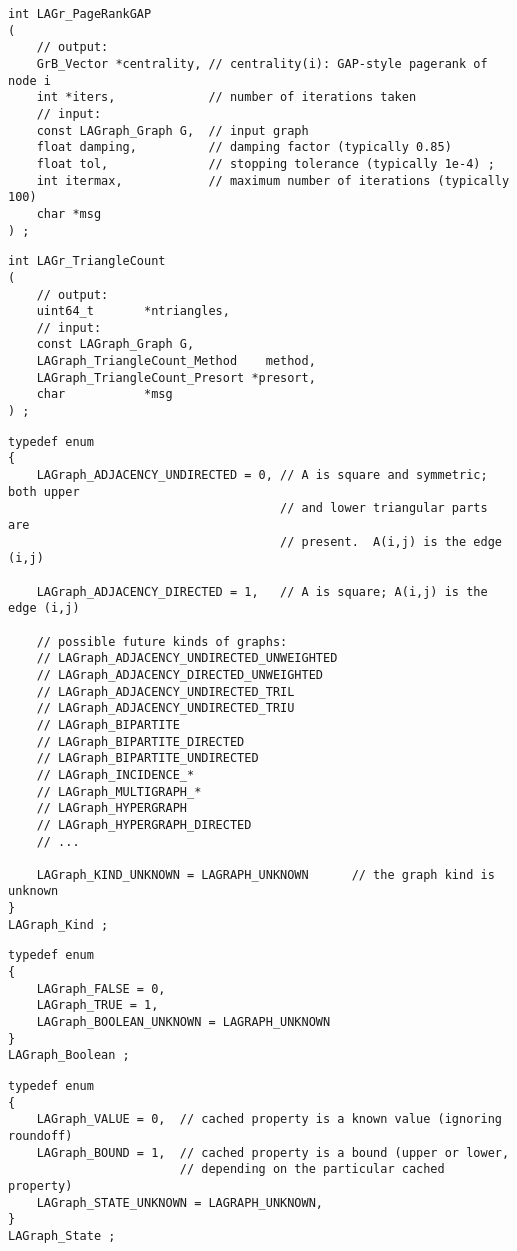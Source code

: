 \begin{verbatim}
int LAGr_PageRankGAP
(
    // output:
    GrB_Vector *centrality, // centrality(i): GAP-style pagerank of node i
    int *iters,             // number of iterations taken
    // input:
    const LAGraph_Graph G,  // input graph
    float damping,          // damping factor (typically 0.85)
    float tol,              // stopping tolerance (typically 1e-4) ;
    int itermax,            // maximum number of iterations (typically 100)
    char *msg
) ;
\end{verbatim}




\begin{verbatim}
int LAGr_TriangleCount
(
    // output:
    uint64_t       *ntriangles,
    // input:
    const LAGraph_Graph G,
    LAGraph_TriangleCount_Method    method,
    LAGraph_TriangleCount_Presort *presort,
    char           *msg
) ;
\end{verbatim}




\begin{verbatim}
typedef enum
{
    LAGraph_ADJACENCY_UNDIRECTED = 0, // A is square and symmetric; both upper
                                      // and lower triangular parts are
                                      // present.  A(i,j) is the edge (i,j)

    LAGraph_ADJACENCY_DIRECTED = 1,   // A is square; A(i,j) is the edge (i,j)

    // possible future kinds of graphs:
    // LAGraph_ADJACENCY_UNDIRECTED_UNWEIGHTED
    // LAGraph_ADJACENCY_DIRECTED_UNWEIGHTED
    // LAGraph_ADJACENCY_UNDIRECTED_TRIL
    // LAGraph_ADJACENCY_UNDIRECTED_TRIU
    // LAGraph_BIPARTITE
    // LAGraph_BIPARTITE_DIRECTED
    // LAGraph_BIPARTITE_UNDIRECTED
    // LAGraph_INCIDENCE_*
    // LAGraph_MULTIGRAPH_*
    // LAGraph_HYPERGRAPH
    // LAGraph_HYPERGRAPH_DIRECTED
    // ...

    LAGraph_KIND_UNKNOWN = LAGRAPH_UNKNOWN      // the graph kind is unknown
}
LAGraph_Kind ;
\end{verbatim}




\begin{verbatim}
typedef enum
{
    LAGraph_FALSE = 0,
    LAGraph_TRUE = 1,
    LAGraph_BOOLEAN_UNKNOWN = LAGRAPH_UNKNOWN
}
LAGraph_Boolean ;
\end{verbatim}




\begin{verbatim}
typedef enum
{
    LAGraph_VALUE = 0,  // cached property is a known value (ignoring roundoff)
    LAGraph_BOUND = 1,  // cached property is a bound (upper or lower,
                        // depending on the particular cached property)
    LAGraph_STATE_UNKNOWN = LAGRAPH_UNKNOWN,
}
LAGraph_State ;
\end{verbatim}




